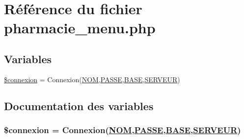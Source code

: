 \hypertarget{pharmacie__menu_8php}{
\section{R\'{e}f\'{e}rence du fichier pharmacie\_\-menu.php}
\label{pharmacie__menu_8php}
}
\subsection*{Variables}
\begin{CompactItemize}
\item 
\hyperlink{pharmacie__menu_8php_a0}{\$connexion} = Connexion(\hyperlink{pma__connect_8php_a0}{NOM},\hyperlink{pma__connect_8php_a1}{PASSE},\hyperlink{pma__connect_8php_a3}{BASE},\hyperlink{pma__connect_8php_a2}{SERVEUR})
\end{CompactItemize}


\subsection{Documentation des variables}
\hypertarget{pharmacie__menu_8php_a0}{
\subsubsection[\$connexion]{\setlength{\rightskip}{0pt plus 5cm}\$connexion = Connexion(\hyperlink{pma__connect_8php_a0}{NOM},\hyperlink{pma__connect_8php_a1}{PASSE},\hyperlink{pma__connect_8php_a3}{BASE},\hyperlink{pma__connect_8php_a2}{SERVEUR})}}
\label{pharmacie__menu_8php_a0}


